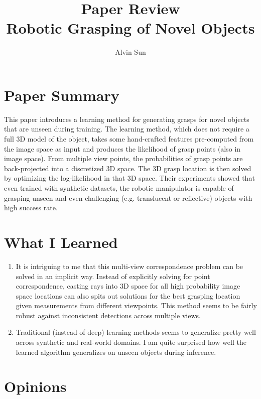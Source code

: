\documentclass[10pt, twocolumn]{article}
\title{Paper Review\\Robotic Grasping of Novel Objects}
\author{Alvin Sun}
\begin{document}
\maketitle

\section{Paper Summary}
This paper introduces a learning method for generating grasps for novel objects
that are unseen during training. The learning method, which does not require
a full 3D model of the object, takes some
hand-crafted features pre-computed from the image space as input and produces
the likelihood of grasp points (also in image space). From multiple view points,
the probabilities of grasp points are back-projected into a discretized 3D space.
The 3D grasp location is then solved by optimizing the log-likelihood in that 3D space.
Their experiments showed that even trained with synthetic datasets, the robotic manipulator
is capable of grasping unseen and even challenging (e.g. translucent or reflective)
objects with high success rate.

\section{What I Learned}
\begin{enumerate}
  \item It is intriguing to me that this multi-view correspondence
    problem can be solved in an implicit way. Instead of explicitly solving for
    point correspondence, casting rays into 3D space for all high probability image
    space locations can also spits out solutions for the best grasping location
    given measurements from different viewpoints.
    This method seems to be fairly robust against
    inconsistent detections across multiple views.
  \item Traditional (instead of deep) learning methods seems to generalize
    pretty well across synthetic and real-world domains. I am quite surprised
    how well the learned algorithm generalizes on unseen objects during inference.
\end{enumerate}

\section{Opinions}
\end{document}
